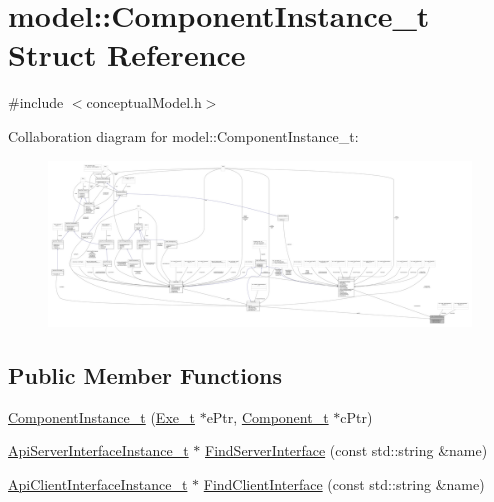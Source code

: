 \hypertarget{structmodel_1_1_component_instance__t}{}\section{model\+:\+:Component\+Instance\+\_\+t Struct Reference}
\label{structmodel_1_1_component_instance__t}


{\ttfamily \#include $<$conceptual\+Model.\+h$>$}



Collaboration diagram for model\+:\+:Component\+Instance\+\_\+t\+:
\nopagebreak
\begin{figure}[H]
\begin{center}
\leavevmode
\includegraphics[width=350pt]{structmodel_1_1_component_instance__t__coll__graph}
\end{center}
\end{figure}
\subsection*{Public Member Functions}
\begin{DoxyCompactItemize}
\item 
\hyperlink{structmodel_1_1_component_instance__t_a4237272d2557385152eeeabf1762f9b0}{Component\+Instance\+\_\+t} (\hyperlink{structmodel_1_1_exe__t}{Exe\+\_\+t} $\ast$e\+Ptr, \hyperlink{structmodel_1_1_component__t}{Component\+\_\+t} $\ast$c\+Ptr)
\item 
\hyperlink{structmodel_1_1_api_server_interface_instance__t}{Api\+Server\+Interface\+Instance\+\_\+t} $\ast$ \hyperlink{structmodel_1_1_component_instance__t_abe2d2c0ae422488475c5bf6af57ee01a}{Find\+Server\+Interface} (const std\+::string \&name)
\item 
\hyperlink{structmodel_1_1_api_client_interface_instance__t}{Api\+Client\+Interface\+Instance\+\_\+t} $\ast$ \hyperlink{structmodel_1_1_component_instance__t_a14a4891983f1b35a7eeebbcef8b85226}{Find\+Client\+Interface} (const std\+::string \&name)
\end{DoxyCompactItemize}
